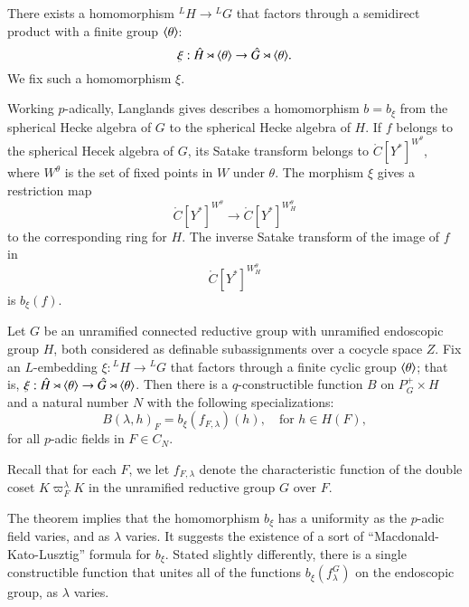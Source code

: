 There exists a homomorphism ${}^LH\to {}^LG$ that factors through a semidirect product with a finite group $\langle{\theta}\rangle$:
\[
\xi:\hat H \rtimes \langle{\theta}\rangle \to \hat G \rtimes \langle{\theta}\rangle.
\]
We fix such a homomorphism $\xi$.  

Working $p$-adically, Langlands gives describes a homomorphism $b = b_\xi$
from the spherical Hecke algebra of $G$ to the spherical Hecke algebra of $H$.
If $f$ belongs to the spherical Hecek algebra of $G$, its Satake transform belongs
to $\ring{C}[Y^*]^{W^\theta}$, where $W^\theta$ is the set of fixed points in $W$ under $\theta$.
The morphism $\xi$ gives a restriction map
\[
\ring{C}[Y^*]^{W^\theta} \to \ring{C}[Y^*]^{W_H^\theta}
\]
to the corresponding ring for $H$.  The inverse Satake transform of the image of $f$ in
\[
\ring{C}[Y^*]^{W_H^\theta}
\]
is $b_\xi(f)$.

\begin{theorem}\label{thm:B}
Let $G$ be an unramified connected reductive group with unramified endoscopic group $H$, both considered as definable
subassignments over a cocycle space $Z$.  Fix an $L$-embedding $\xi:{}^LH\to {}^LG$ that factors through a finite
cyclic group $\langle{\theta}\rangle$; that is, $\xi:\hat H\rtimes \langle{\theta}\rangle \to \hat G \rtimes \langle{\theta}\rangle$.
Then
there is a $q$-constructible function $B$ on $P^+_G\times H$ and a natural number $N$ with the following specializations:
\[
B(\lambda,h)_F = b_\xi(f_{F,\lambda})(h),\quad \text{for } h\in H(F),
\]
for all $p$-adic fields in $F\in C_N$.  
\end{theorem}

Recall that for each $F$, we let  $f_{F,\lambda}$ denote the characteristic function
of the double coset $K\varpi_F^\lambda K$ in the unramified reductive group $G$ over $F$.

The theorem implies that the homomorphism $b_\xi$ has a uniformity as the $p$-adic field
varies, and as $\lambda$ varies.  It suggests the existence of a sort of ``Macdonald-Kato-Lusztig''
formula for $b_\xi$.
Stated slightly differently, there is a single constructible function that unites
all of the functions $b_\xi (f^G_\lambda)$ on the endoscopic group, as $\lambda$ varies.

